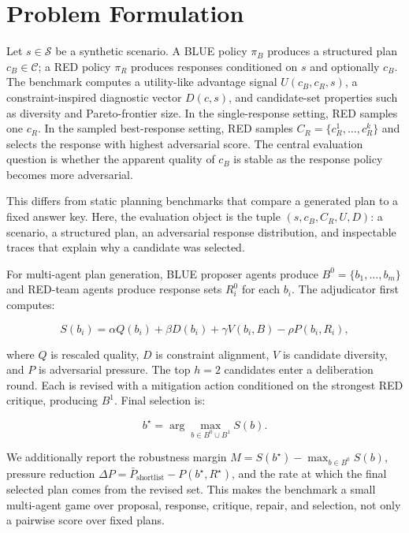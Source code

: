 \documentclass[letterpaper]{article} %
\begin{document}
\section{Problem Formulation}

Let $s \in \mathcal{S}$ be a synthetic scenario. A BLUE policy $\pi_B$ produces a structured plan $c_B \in \mathcal{C}$; a RED policy $\pi_R$ produces responses conditioned on $s$ and optionally $c_B$. The benchmark computes a utility-like advantage signal $U(c_B,c_R,s)$, a constraint-inspired diagnostic vector $D(c,s)$, and candidate-set properties such as diversity and Pareto-frontier size. In the single-response setting, RED samples one $c_R$. In the sampled best-response setting, RED samples $C_R=\{c_R^1,\ldots,c_R^k\}$ and selects the response with highest adversarial score. The central evaluation question is whether the apparent quality of $c_B$ is stable as the response policy becomes more adversarial.

This differs from static planning benchmarks that compare a generated plan to a fixed answer key. Here, the evaluation object is the tuple $(s,c_B,C_R,U,D)$: a scenario, a structured plan, an adversarial response distribution, and inspectable traces that explain why a candidate was selected.

For multi-agent plan generation, BLUE proposer agents produce $B^0=\{b_1,\ldots,b_m\}$ and RED-team agents produce response sets $R_i^0$ for each $b_i$. The adjudicator first computes:

\begin{equation}
S(b_i) = \alpha Q(b_i)+\beta D(b_i)+\gamma V(b_i,B)-\rho P(b_i,R_i),
\end{equation}

where $Q$ is rescaled quality, $D$ is constraint alignment, $V$ is candidate diversity, and $P$ is adversarial pressure. The top $h=2$ candidates enter a deliberation round. Each is revised with a mitigation action conditioned on the strongest RED critique, producing $B^1$. Final selection is:

\begin{equation}
b^\star = \arg\max_{b \in B^0 \cup B^1} S(b).
\end{equation}

We additionally report the robustness margin $M=S(b^\star)-\max_{b\in B^0}S(b)$, pressure reduction $\Delta P=\bar{P}_{\mathrm{shortlist}}-P(b^\star,R^\star)$, and the rate at which the final selected plan comes from the revised set. This makes the benchmark a small multi-agent game over proposal, response, critique, repair, and selection, not only a pairwise score over fixed plans.
\end{document}
